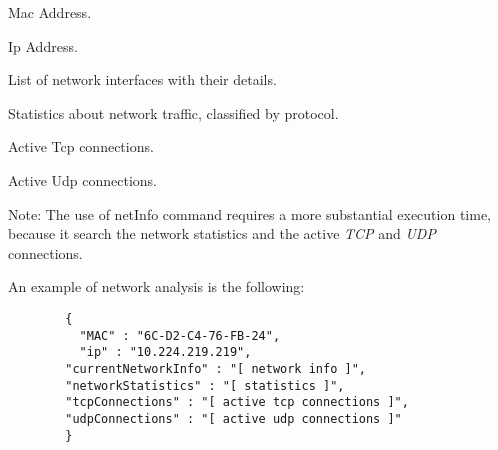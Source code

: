 \begin{description}
  \setlength\itemsep{1em}
  \item [Mac] Mac Address.
  \item [Ip] Ip Address.
  \item [CurrentNetworkInfo] List of network interfaces with their details.
  \item [NetworkStatistics] Statistics about network traffic, classified by protocol.
  \item [TcpConnections] Active Tcp connections.
  \item [UdpConnections] Active Udp connections.
 \end{description}

Note: The use of netInfo command requires a more substantial execution time, because it search the network statistics and the active \textit{TCP} and \textit{UDP} connections.

An example of network analysis is the following:

\begin{description}
	\item 
		\begin{verbatim}
		{
		  "MAC" : "6C-D2-C4-76-FB-24",
		  "ip" : "10.224.219.219",
	 	"currentNetworkInfo" : "[ network info ]",
	 	"networkStatistics" : "[ statistics ]",
	 	"tcpConnections" : "[ active tcp connections ]",
	 	"udpConnections" : "[ active udp connections ]"
		}
	\end{verbatim}
\end{description}
